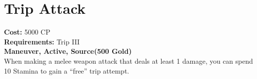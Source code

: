\section{Trip Attack}
\textbf{Cost:} 5000 CP\\
\textbf{Requirements:} Trip III\\
\textbf{Maneuver, Active, Source(500 Gold)}\\
When making a melee weapon attack that deals at least 1 damage, you can spend 10 Stamina to gain a “free” trip attempt.\\
